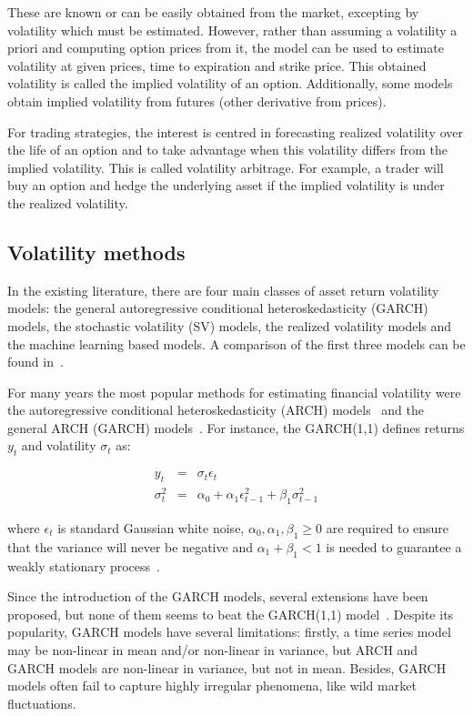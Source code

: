 These are known or can be easily obtained from the market, excepting by
volatility which must be estimated. However, rather than assuming a volatility
a priori and computing option prices from it, the model can be used to estimate
volatility at given prices, time to expiration and strike price. This obtained
volatility is called the implied volatility of an option. Additionally, some
models obtain implied volatility from futures (other derivative from prices). 


For trading strategies, the interest is centred in forecasting realized
volatility over the life of an option and to take advantage when this
volatility differs from the implied volatility. This is called volatility
arbitrage. For example, a trader will buy an option and hedge the underlying
asset if the implied volatility is under the realized volatility. 


\subsection{Volatility methods}

In the existing literature, there are four main classes of asset
return volatility models: the general autoregressive conditional
heteroskedasticity (GARCH) models, the stochastic volatility (SV)
models, the realized volatility models and the machine learning based
models. A comparison of the first three models can be found
in~\cite{wei2012}. 

For many years the most popular methods for estimating financial
volatility were the autoregressive conditional heteroskedasticity
(ARCH) models~\cite{engle1982} and the general ARCH (GARCH)
models~\cite{bollerslev1986}. For instance, the GARCH(1,1) defines
returns $y_t$ and volatility $\sigma_t$ as:

\begin{eqnarray*}
    y_t &=& \sigma_t \epsilon_t \\
     \sigma_t^2 &=& \alpha_0 + \alpha_1 \epsilon_{t-1}^2 + \beta_1
     \sigma_{t-1}^2
\end{eqnarray*}

\noindent where $\epsilon_t$ is standard Gaussian white noise,
$\alpha_0,\alpha_1,\beta_1 \geq 0$ are required to ensure that the
variance will never be negative and $\alpha_1+\beta_1 <1$ is needed to
guarantee a weakly stationary process~\cite{nelson1990}.

Since the introduction of the GARCH models, several extensions have been
proposed, but none of them seems to beat the GARCH(1,1)
model~\cite{lunde+hansen2005}. Despite its popularity, GARCH models have
several limitations: firstly, a time series model may be non-linear in mean
and/or non-linear in variance, but ARCH and GARCH models are non-linear in
variance, but not in mean. Besides, GARCH models often fail to capture highly
irregular phenomena, like wild market fluctuations.  

